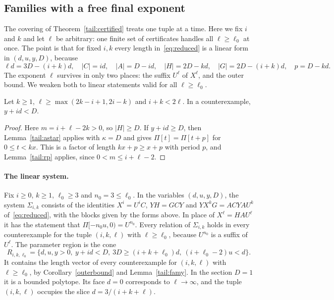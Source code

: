 \subsection{Families with a free final exponent}\label{tail:fam-sec}

The covering of Theorem~\ref{tail:certified} treats one tuple at a time. Here we fix \(i\) and \(k\) and let \(\ell\) be arbitrary: one finite set of certificates handles all \(\ell\ge\ell_0\) at once. The point is that for fixed \(i,k\) every length in~\eqref{eq:reduced} is a linear form in \((d,u,y,D)\), because
\[
\ell d=3D-(i+k)d,\quad |C|=id,\quad |A|=D-id,\quad |H|=2D-kd,\quad |G|=2D-(i+k)d,\quad p=D-kd .
\]
The exponent \(\ell\) survives in only two places: the suffix \(U^\ell\) of \(X^\ell\), and the outer bound. We weaken both to linear statements valid for all \(\ell\ge\ell_0\).

\begin{lemma}\label{tail:famy}
Let \(k\ge1\), \(\ell\ge\max(2k-i+1,2i-k)\) and \(i+k<2\ell\). In a counterexample, \(y+id<D\).
\end{lemma}
\begin{proof}
Here \(m=i+\ell-2k>0\), so \(|H|\ge D\). If \(y+id\ge D\), then Lemma~\ref{tail:astar} applies with \(\kappa=D\) and gives \(\Pi[t]=\Pi[t+p]\) for \(0\le t<kx\). This is a factor of length \(kx+p\ge x+p\) with period \(p\), and Lemma~\ref{tail:rp} applies, since \(0<m\le i+\ell-2\).
\end{proof}

\paragraph{The linear system.} Fix \(i\ge0\), \(k\ge1\), \(\ell_0\ge3\) and \(n_0=3\le\ell_0\). In the variables \((d,u,y,D)\), the system \(\Sigma_{i,k}\) consists of the identities \(X^i=U^iC\), \(YH=GCY\) and \(YX^kG=ACYAU^k\) of~\eqref{eq:reduced}, with the blocks given by the forms above. In place of \(X^\ell=HAU^\ell\) it has the statement that \(\Pi[-n_0u,0)=U^{n_0}\). Every relation of \(\Sigma_{i,k}\) holds in every counterexample for the tuple \((i,k,\ell)\) with \(\ell\ge\ell_0\), because \(U^{n_0}\) is a suffix of \(U^\ell\). The parameter region is the cone
\[
R_{i,k,\ell_0}=\{d,u,y>0,\ y+id<D,\ 3D\ge(i+k+\ell_0)d,\ (i+\ell_0-2)u<d\}.
\]
It contains the length vector of every counterexample for \((i,k,\ell)\) with \(\ell\ge\ell_0\), by Corollary~\ref{outerbound} and Lemma~\ref{tail:famy}. In the section \(D=1\) it is a bounded polytope. Its face \(d=0\) corresponds to \(\ell\to\infty\), and the tuple \((i,k,\ell)\) occupies the slice \(d=3/(i+k+\ell)\).

